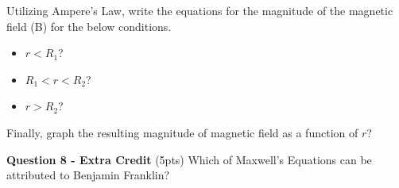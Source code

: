 \documentclass[14pt]{report}
\begin{document}
Utilizing Ampere's Law, write the equations for the magnitude of the magnetic field (B) for the below conditions. 

\begin{itemize}
\item $r < R_1$?
\item $R_1 < r < R_2$?
\item $r > R_2$?
\end{itemize}

Finally, graph the resulting magnitude of magnetic field as a function of $r$?

\textbf{Question 8 - Extra Credit} (5pts)
Which of Maxwell's Equations can be attributed to Benjamin Franklin?
 
\end{document}
